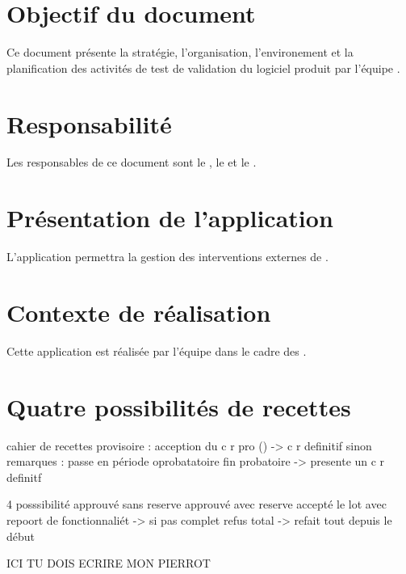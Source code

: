 \section{Objectif du document}
	Ce document présente la stratégie, l'organisation, l'environement et la planification des activités de test de validation du logiciel produit par l'équipe \nomClient.
	
\section{Responsabilité}
	Les responsables de ce document sont le \CP, le \RQ{} et le \RD.
	
\section{Présentation de l'application}
	L'application permettra la gestion des interventions externes de \nomClient.
	
\section{Contexte de réalisation}
	Cette application est réalisée par l'équipe \nomEquipe dans le cadre des \PIC.

\section{Quatre possibilités de recettes}
	cahier de recettes provisoire :
		acception du c r pro  () -> c r definitif
	sinon
		remarques : passe en période oprobatatoire
		fin probatoire -> presente un c r definitf
		
		4 posssibilité
			approuvé sans reserve
			approuvé avec reserve
			accepté le lot avec repoort de fonctionnaliét
				-> si pas complet
			refus total
				-> refait tout depuis le début
				
ICI TU DOIS ECRIRE MON PIERROT